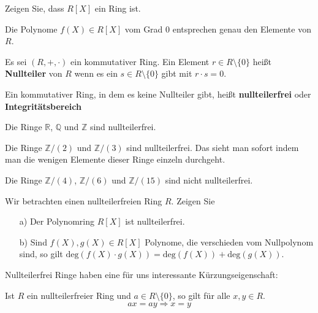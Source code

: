 \begin{aufgabe} Zeigen Sie, dass $R[X]$ ein Ring ist. \end{aufgabe}

\begin{aufgabe} Die Polynome $f(X) \in R[X]$ vom Grad 0 entsprechen genau den Elemente von $R$.
\end{aufgabe}

\begin{definition} Es sei $(R, + , \cdot)$ ein kommutativer Ring. Ein Element $r \in R \setminus \{0\}$ heißt 
\textbf{Nullteiler} von $R$ wenn es ein $s \in R \setminus \{0\}$ gibt mit $r \cdot s = 0$.

Ein kommutativer Ring, in dem es keine Nullteiler gibt, heißt \textbf{nullteilerfrei} oder \textbf{Integritätsbereich}
\end{definition}

\begin{beispiel} Die Ringe $\mathbb R$, $\mathbb Q$ und $\mathbb Z$ sind nullteilerfrei.
\end{beispiel}

\begin{beispiel} Die Ringe $\mathbb Z/ (2)$ und $\mathbb Z/ (3)$ sind nullteilerfrei. Das sieht man sofort indem 
man die wenigen Elemente dieser Ringe einzeln durchgeht. 
\end{beispiel}

\begin{beispiel} Die Ringe $\mathbb Z/ (4)$, $\mathbb Z/ (6)$ und $\mathbb Z/ (15)$ sind nicht nullteilerfrei.
\end{beispiel}

\begin{aufgabe}\label{aufgabe_polynom_nzd} Wir betrachten einen nullteilerfreien Ring $R$. Zeigen Sie
\begin{itemize}
\item[a)] Der Polynomring $R[X]$ ist nullteilerfrei.
\item[b)] Sind $f(X), g(X) \in R[X]$ Polynome, die verschieden vom Nullpolynom sind, so gilt 
$\textrm{deg}(f(X) \cdot g(X)) = \textrm{deg}(f(X)) + \textrm{deg}(g(X))$.
\end{itemize} 
\end{aufgabe}

\medbreak

Nullteilerfrei Ringe haben eine für uns interessante Kürzungseigenschaft:

\begin{satz}\label{gruppe_kurzungsregel} 
Ist $R$ ein nullteilerfreier Ring und $a \in R \setminus \{0\}$, so gilt für alle $x, y \in R$.
  	$$ ax = ay \Longrightarrow x = y $$
\end{satz}

